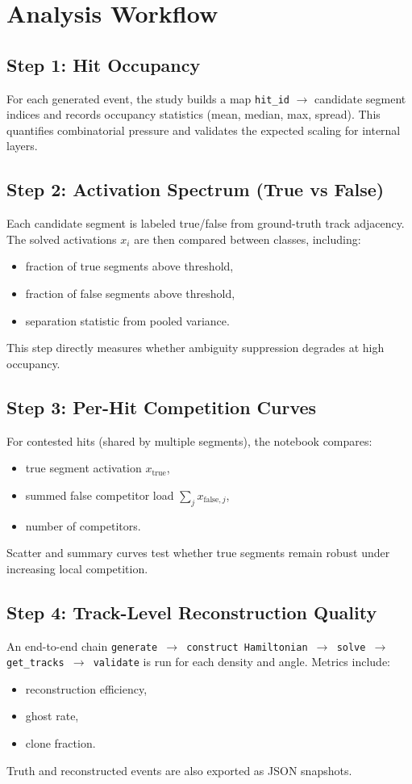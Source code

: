 \documentclass[11pt,a4paper]{article}
\begin{document}
\section{Analysis Workflow}
\subsection{Step 1: Hit Occupancy}
For each generated event, the study builds a map
\texttt{hit\_id} $\to$ candidate segment indices and records occupancy
statistics (mean, median, max, spread). This quantifies combinatorial pressure
and validates the expected scaling for internal layers.

\subsection{Step 2: Activation Spectrum (True vs False)}
Each candidate segment is labeled true/false from ground-truth track adjacency.
The solved activations $x_i$ are then compared between classes, including:
\begin{itemize}[leftmargin=1.5em]
  \item fraction of true segments above threshold,
  \item fraction of false segments above threshold,
  \item separation statistic from pooled variance.
\end{itemize}
This step directly measures whether ambiguity suppression degrades at high
occupancy.

\subsection{Step 3: Per-Hit Competition Curves}
For contested hits (shared by multiple segments), the notebook compares:
\begin{itemize}[leftmargin=1.5em]
  \item true segment activation $x_{\text{true}}$,
  \item summed false competitor load $\sum_j x_{\text{false},j}$,
  \item number of competitors.
\end{itemize}
Scatter and summary curves test whether true segments remain robust under
increasing local competition.

\subsection{Step 4: Track-Level Reconstruction Quality}
An end-to-end chain
\texttt{generate $\to$ construct Hamiltonian $\to$ solve $\to$ get\_tracks $\to$ validate}
is run for each density and angle. Metrics include:
\begin{itemize}[leftmargin=1.5em]
  \item reconstruction efficiency,
  \item ghost rate,
  \item clone fraction.
\end{itemize}
Truth and reconstructed events are also exported as JSON snapshots.
\end{document}
